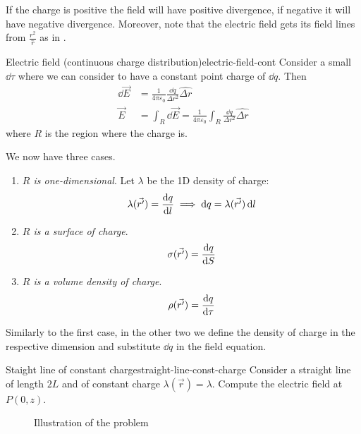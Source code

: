 \documentclass[12pt]{extarticle}
\begin{document}
If the charge is positive the field will have positive divergence, if negative it will have negative divergence.
Moreover, note that the electric field gets its field lines from $\frac{r^2}{\hat r}$ as in .

\begin{definition}{Electric field (continuous charge distribution)}{electric-field-cont}
    Consider a small $\dd{\tau}$ where we can consider to have a constant point charge of $\dd{q}$.
    Then
    \begin{align}
        \dd{\vec E} & = \frac{1}{4\pi \varepsilon_0} \frac{\dd{q}}{\Delta r^2} \hat{\Delta r}                             \\
        \vec E      & = \int_R \dd{\vec E} = \frac{1}{4\pi \varepsilon_0} \int_R \frac{\dd{q}}{\Delta r^2} \hat{\Delta r}
    \end{align}
    where $R$ is the region where the charge is.
\end{definition}

We now have three cases.
\begin{enumerate}
    \item \emph{$R$ is one-dimensional}.
          Let $\lambda$ be the 1D density of charge:
          \begin{equation}
              \lambda(\vec {r'}) = \dv{q}{l} \implies \dd{q} = \lambda (\vec {r'}) \dd{l}
          \end{equation}
    \item \emph{$R$ is a surface of charge}.
          \begin{equation}
              \sigma(\vec {r'}) = \dv{q}{S}
          \end{equation}
    \item \emph{$R$ is a volume density of charge}.
          \begin{equation}
              \rho(\vec {r'}) = \dv{q}{\tau}
          \end{equation}
\end{enumerate}
Similarly to the first case, in the other two we define the density of charge in the respective dimension and substitute $\dd{q}$ in the field equation.

\begin{example}{Staight line of constant charge}{straight-line-const-charge}
    Consider a straight line of length $2L$ and of constant charge $\lambda(\vec r) = \lambda$.
    Compute the electric field at $P(0,z)$.

    \begin{figure}[H]
        \centering
        
        \caption{Illustration of the problem}
    \end{figure}
\end{example}
\end{document}
